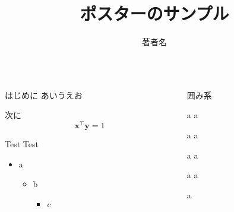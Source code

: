 \documentclass[dvipdfmx]{beamer}
\title{ポスターのサンプル}
\author{著者名}
\institute{所属機関名}
\begin{document}
\begin{frame}
\begin{columns}[t]
	\begin{column}{0.48\linewidth}
		\begin{mybox}{はじめに}
			あいうえお
		\end{mybox}
		\begin{mybox}{次に}
			\[
			\bm{x}^\top\bm{y}=1
			\]
		\end{mybox}
		\begin{mybox}{Test}
			Test
			\begin{itemize}
				\item a
				\begin{itemize}
					\item b
					\begin{itemize}
						\item c
					\end{itemize}
				\end{itemize}
			\end{itemize}
		\end{mybox}
	\end{column}
	\begin{column}{0.48\linewidth}
		\begin{mybox}{囲み系}
			\begin{block}{a}
				a
			\end{block}
			\begin{alertblock}{a}
				a
			\end{alertblock}
			\begin{exampleblock}{a}
				a
			\end{exampleblock}
			\begin{itembox}{a}
			a
			\end{itembox}
			\begin{tcolorbox}[colframe=green,
			colback=green!10!white,
			colbacktitle=green!40!white,
			coltitle=black, fonttitle=\bfseries,
			title=a]
			a
			\end{tcolorbox}
		\end{mybox}
	\end{column}
\end{columns}
\end{frame}
\end{document}
